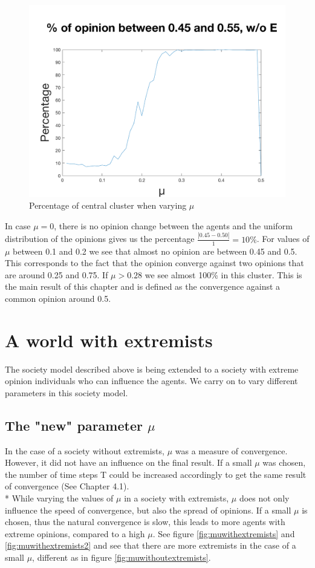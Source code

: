 \documentclass[11pt]{article}
\begin{document}
\begin{figure}[!htb]
\center
  \includegraphics[width=0.7\linewidth]{gen_plot_intervall_2017121813242572120e-01.png}
  \caption{Percentage of central cluster when varying $\mu$}
  \label{fig:uwithoutextremists}
\end{figure}

In case $\mu = 0$, there is no opinion change between the agents and the uniform distribution of the opinions gives us the percentage $\frac{|0.45-0.50|}{1} = 10\%$. For values of $\mu$ between 0.1 and 0.2 we see that almost no opinion are between 0.45 and 0.5. This corresponds to the fact that the opinion converge against two opinions that are around 0.25 and 0.75. If $\mu > 0.28$ we see almost 100\% in this cluster. This is the main result of this chapter and is defined as the convergence against a common opinion around 0.5.

\section{A world with extremists}
The society model described above is being extended to a society with extreme opinion individuals who can influence the agents. We carry on to vary different parameters in this society model.

\subsection{The "new" parameter \texorpdfstring{$\mu$}{TEXT}}
In the case of a society without extremists, $\mu$ was a measure of convergence. However, it did not have an influence on the final result. If a small $\mu$ was chosen, the number of time steps T could be increased accordingly to get the same result of convergence (See Chapter 4.1). \\*
While varying the values of $\mu$ in a society with extremists, $\mu$ does not only influence the speed of convergence, but also the spread of opinions. If a small $\mu$ is chosen, thus the natural convergence is slow, this leads to more agents with extreme opinions, compared to a high $\mu$. See figure \ref{fig:muwithextremists} and \ref{fig:muwithextremists2} and see that there are more extremists in the case of a small $\mu$, different as in figure  \ref{fig:muwithoutextremists}.
\end{document}
